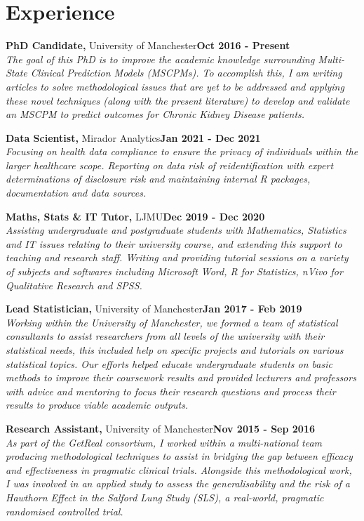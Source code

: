 \documentclass[11pt]{article}
\newcommand{\blue}[1]{\textcolor{MyBlue1}{#1}}
\begin{document}
\newpage
\section{Experience}

\newcommand{\experience}[5]{
\blue{\textbf{#1,} #2}\hfill\textbf{#3 - #4}\\
\textit{#5}
}

\experience{PhD Candidate}{University of Manchester}{Oct 2016}{Present}{
The goal of this PhD is to improve the academic knowledge surrounding Multi-State Clinical Prediction Models (MSCPMs). To accomplish this, I am writing articles to solve methodological issues that are yet to be addressed and applying these novel techniques (along with the present literature) to develop and validate an MSCPM to predict outcomes for Chronic Kidney Disease patients.}

\experience{Data Scientist}{Mirador Analytics}{Jan 2021}{Dec 2021}{
Focusing on health data compliance to ensure the privacy of individuals within the larger healthcare scope. Reporting on data risk of reidentification with expert determinations of disclosure risk and maintaining internal R packages, documentation
and data sources.}

\experience{Maths, Stats \& IT Tutor}{LJMU}{Dec 2019}{Dec 2020}{
Assisting undergraduate and postgraduate students with Mathematics, Statistics and IT issues relating to their university course, and extending this support to teaching and research staff. Writing and providing tutorial sessions on a variety of subjects and softwares including Microsoft Word, R for Statistics, nVivo for Qualitative Research and SPSS.}

\experience{Lead Statistician}{University of Manchester}{Jan 2017}{Feb 2019}{
Working within the University of Manchester, we formed a team of statistical consultants to assist researchers from all levels of the university with their statistical needs, this included help on specific projects and tutorials on various statistical topics. Our efforts helped educate undergraduate students on basic methods to improve their coursework results and provided lecturers and professors with advice and mentoring to focus their research questions and process their results to produce viable academic outputs.}

\experience{Research Assistant}{University of Manchester}{Nov 2015}{Sep 2016}{
As part of the GetReal consortium, I worked within a multi-national team producing methodological techniques to assist in bridging the gap between efficacy and effectiveness in pragmatic clinical trials. Alongside this methodological work, I was involved in an applied study to assess the generalisability and the risk of a Hawthorn Effect in the Salford Lung Study (SLS), a real-world, pragmatic randomised controlled trial.}
\end{document}
